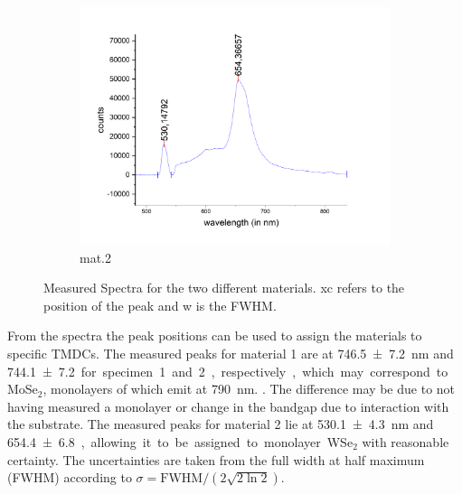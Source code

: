 \begin{figure}[!ht]
\begin{subfigure}{0.7\textwidth}
        \centering
        \includegraphics[width=\textwidth]{img/output_t1/spekt_m2}
        \caption{mat.2}
	      \label{fig_mono_spec3_1dspec}
    \end{subfigure}
    \caption{Measured Spectra for the two different materials. xc refers to the position of the peak and w is the FWHM.}
	\label{fig_mono_1dspectra} %
\end{figure}

From the spectra the peak positions can be used to assign the materials to specific TMDCs.
The measured peaks for material 1 are at \SI{746,5\pm 7,2}{nm} and \SI{744,1 \pm 7,2} for specimen 1 and 2, respectively, which may correspond to MoSe$_2$, monolayers of which emit at \SI{790}{nm}. \cite{Tonndorf2013}.
The difference may be due to not having measured a monolayer or change in the bandgap due to interaction with the substrate.
The measured peaks for material 2 lie at \SI{530,1 \pm 4,3}{nm} and \SI{654,4 \pm 6,8}, allowing it to be assigned to monolayer WSe$_2$ with reasonable certainty.
The uncertainties are taken from the full width at half maximum (FWHM) according to $\sigma = \mathrm{FWHM}/(2\sqrt{2 \ln 2})$.
